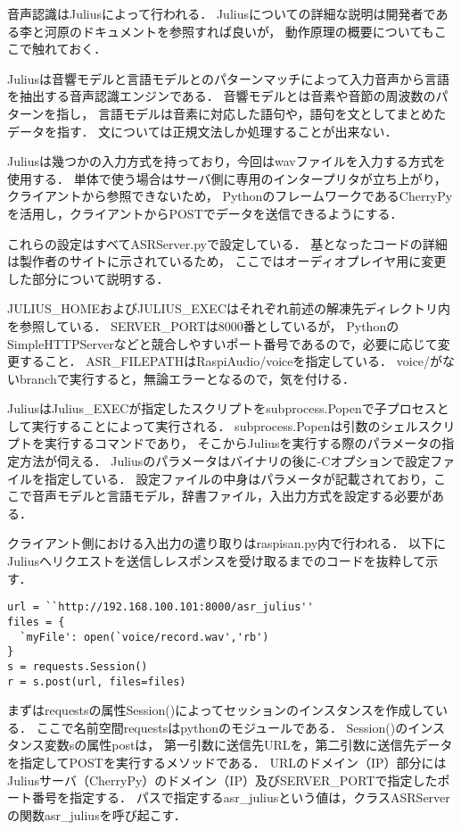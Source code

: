 \documentclass{jsarticle}
\begin{document}
\begin{multicols}{2}
音声認識はJuliusによって行われる．
Juliusについての詳細な説明は開発者である李と河原のドキュメント\cite{kawahara}を参照すれば良いが，
動作原理の概要についてもここで触れておく．

Juliusは音響モデルと言語モデルとのパターンマッチによって入力音声から言語を抽出する音声認識エンジンである．
音響モデルとは音素や音節の周波数のパターンを指し，
言語モデルは音素に対応した語句や，語句を文としてまとめたデータを指す．
文については正規文法しか処理することが出来ない．

Juliusは幾つかの入力方式を持っており，今回はwavファイルを入力する方式を使用する．
単体で使う場合はサーバ側に専用のインタープリタが立ち上がり，クライアントから参照できないため，
PythonのフレームワークであるCherryPyを活用し，クライアントからPOSTでデータを送信できるようにする．

これらの設定はすべてASRServer.pyで設定している．
基となったコードの詳細は製作者のサイト\cite{sayonari}に示されているため，
ここではオーディオプレイヤ用に変更した部分について説明する．

JULIUS\_HOMEおよびJULIUS\_EXECはそれぞれ前述の解凍先ディレクトリ内を参照している．
SERVER\_PORTは8000番としているが，
PythonのSimpleHTTPServerなどと競合しやすいポート番号であるので，必要に応じて変更すること．
ASR\_FILEPATHはRaspiAudio/voiceを指定している．
voice/がないbranchで実行すると，無論エラーとなるので，気を付ける．

JuliusはJulius\_EXECが指定したスクリプトをsubprocess.Popenで子プロセスとして実行することによって実行される．
subprocess.Popenは引数のシェルスクリプトを実行するコマンドであり，
そこからJuliusを実行する際のパラメータの指定方法が伺える．
Juliusのパラメータはバイナリの後に-Cオプションで設定ファイルを指定している．
設定ファイルの中身はパラメータが記載されており，ここで音声モデルと言語モデル，辞書ファイル，入出力方式を設定する必要がある．

クライアント側における入出力の遣り取りはraspisan.py内で行われる．
以下にJuliusへリクエストを送信しレスポンスを受け取るまでのコードを抜粋して示す．
\begin{lstlisting}[caption=RaspiAudio/raspisan.py]
url = ``http://192.168.100.101:8000/asr_julius''
files = { 
  `myFile': open(`voice/record.wav','rb')
}
s = requests.Session()
r = s.post(url, files=files)
\end{lstlisting}

まずはrequestsの属性Session()によってセッションのインスタンスを作成している．
ここで名前空間requestsはpythonのモジュールである．
Session()のインスタンス変数sの属性postは，
第一引数に送信先URLを，第二引数に送信先データを指定してPOSTを実行するメソッドである．
URLのドメイン（IP）部分にはJuliusサーバ（CherryPy）のドメイン（IP）及びSERVER\_PORTで指定したポート番号を指定する．
パスで指定するasr\_juliusという値は，クラスASRServerの関数asr\_juliusを呼び起こす．


\end{multicols}
\end{document}
